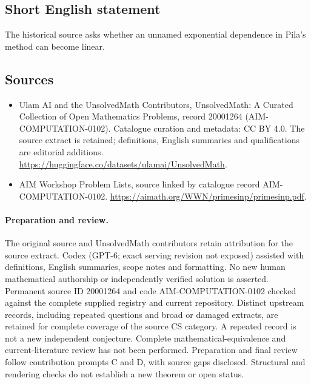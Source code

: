 \documentclass[11pt]{article}
\begin{document}
\subsection{Short English statement}
The historical source asks whether an unnamed exponential dependence in Pila's method can become linear.
\subsection{Sources}
\begin{itemize}
\item[\hypertarget{source:20001264:1}{S1}] Ulam AI and the UnsolvedMath Contributors, UnsolvedMath: A Curated Collection of Open Mathematics Problems, record 20001264 (AIM-COMPUTATION-0102). Catalogue curation and metadata: CC BY 4.0. The source extract is retained; definitions, English summaries and qualifications are editorial additions.
\url{https://huggingface.co/datasets/ulamai/UnsolvedMath}.
\item[\hypertarget{source:20001264:2}{S2}] AIM Workshop Problem Lists, source linked by catalogue record AIM-COMPUTATION-0102.
\url{https://aimath.org/WWN/primesinp/primesinp.pdf}.
\end{itemize}
\paragraph{Preparation and review.}
The original source and UnsolvedMath contributors retain attribution for the source extract. Codex (GPT-6; exact serving revision not exposed) assisted with definitions, English summaries, scope notes and formatting. No new human mathematical authorship or independently verified solution is asserted. Permanent source ID 20001264 and code AIM-COMPUTATION-0102 checked against the complete supplied registry and current repository. Distinct upstream records, including repeated questions and broad or damaged extracts, are retained for complete coverage of the source CS category. A repeated record is not a new independent conjecture. Complete mathematical-equivalence and current-literature review has not been performed. Preparation and final review follow contribution prompts C and D, with source gaps disclosed. Structural and rendering checks do not establish a new theorem or open status.
\label{end:20001264}
\end{document}
